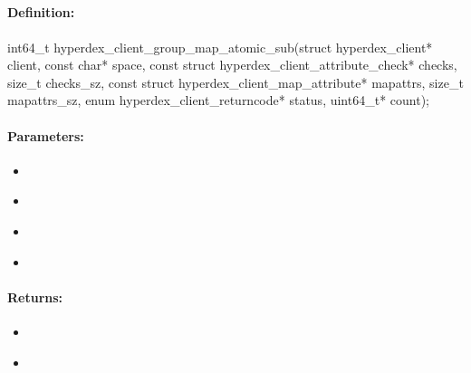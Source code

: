 \pagebreak
\subsection{}
\label{api:c:group_map_atomic_sub}


\paragraph{Definition:}
\begin{ccode}
int64_t hyperdex_client_group_map_atomic_sub(struct hyperdex_client* client,
        const char* space,
        const struct hyperdex_client_attribute_check* checks, size_t checks_sz,
        const struct hyperdex_client_map_attribute* mapattrs, size_t mapattrs_sz,
        enum hyperdex_client_returncode* status,
        uint64_t* count);
\end{ccode}

\paragraph{Parameters:}
\begin{itemize}[noitemsep]
\item {}\\

\item {}\\

\item {}\\

\item {}\\

\end{itemize}

\paragraph{Returns:}
\begin{itemize}[noitemsep]
\item {}\\

\item {}\\

\end{itemize}

